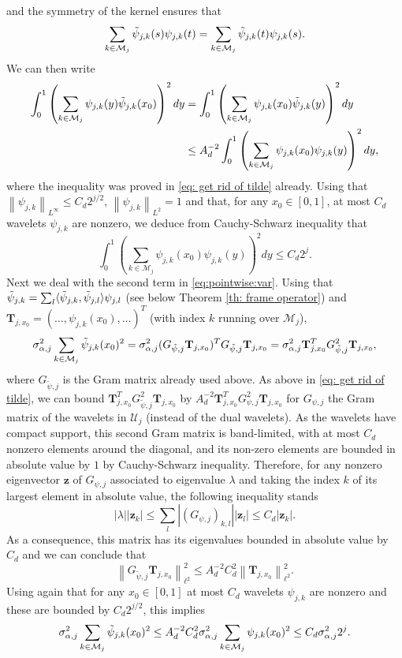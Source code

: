 \documentclass[preprint]{imsart}
\newcommand\norm[1]{\left\lVert#1\right\rVert}
\numberwithin{equation}{section}
\newcounter{cond}
\begin{document}
\begin{appendix}
and the symmetry of the kernel ensures that
\begin{equation}\label{eq: sym kernel splwav}
\sum_{k\in\mathcal{M}_{j}}\Tilde{\psi}_{j,k}(s) \psi_{j,k}(t) = \sum_{k\in\mathcal{M}_{j}}\Tilde{\psi}_{j,k}(t) \psi_{j,k}(s).
\end{equation}
We can then write
\begin{align*}
     \int_0^1 \left(\sum_{k\in\mathcal{M}_{j}} \psi_{j,k}(y)\Tilde{\psi}_{j,k}(x_0) \right)^2 dy &= \int_0^1 \left(\sum_{k\in\mathcal{M}_{j}} \psi_{j,k}(x_0)\Tilde{\psi}_{j,k}(y) \right)^2 dy\\
    &\leq A_d^{-2} \int_0^1 \left(\sum_{k\in\mathcal{M}_{j}} \psi_{j,k}(x_0)\psi_{j,k}(y) \right)^2 dy,
\end{align*}
where the inequality was proved in \eqref{eq: get rid of tilde} already. Using that $\norm{\psi_{j,k}}_{L^\infty}\leq C_d 2^{j/2}$, $\norm{\psi_{j,k}}_{L^2}= 1$ and that, for any $x_0\in[0,1]$, at most $C_d$ wavelets $\psi_{j,k}$ are nonzero, we deduce from Cauchy-Schwarz inequality that
\[\int_0^1 \left(\sum_{k\in\mathcal{M}_{j}} \psi_{j,k}(x_0)\psi_{j,k}(y) \right)^2 dy \leq C_d2^j.\]
Next we deal with the second term in \eqref{eq:pointwise:var}. Using that $\Tilde{\psi}_{j,k} = \sum_l \langle \Tilde{\psi}_{j,k}, \Tilde{\psi}_{j,l} \rangle  \psi_{j,l}$ (see below Theorem \ref{th: frame operator}) and $\mathbf{T}_{j,x_0}=(\dots,\psi_{j,k}(x_0),\dots)^T$ (with index $k$ running over $\mathcal{M}_j$),
\begin{align*}
\sigma_{\alpha,j}^2 \sum_{k\in\mathcal{M}_{j}}\Tilde{\psi}_{j,k}(x_0)^2 = \sigma_{\alpha,j}^2(G_{\tilde{\psi},j}\mathbf{T}_{j,x_0})^TG_{\tilde{\psi},j}\mathbf{T}_{j,x_0}= \sigma_{\alpha,j}^2\mathbf{T}_{j,x_0}^TG_{\tilde{\psi},j}^2\mathbf{T}_{j,x_0},
\end{align*}
where $G_{\tilde{\psi},j}$ is the Gram matrix already used above. As above in \eqref{eq: get rid of tilde}, we can bound $\mathbf{T}_{j,x_0}^TG_{\tilde{\psi},j}^2\mathbf{T}_{j,x_0}$ by $A_d^{-2}\mathbf{T}_{j,x_0}^TG_{\psi,j}^2\mathbf{T}_{j,x_0}$ for $G_{\psi,j}$ the Gram matrix of the wavelets in $\mathcal{U}_j$ (instead of the dual wavelets). As the wavelets have compact support, this second Gram matrix is band-limited, with at most $C_d$ nonzero elements around the diagonal, and its non-zero elements are bounded in absolute value by $1$ by Cauchy-Schwarz inequality. Therefore, for any nonzero eigenvector $\mathbf{z}$ of $G_{\psi,j}$ associated to eigenvalue $\lambda$ and taking the index $k$ of its largest element in absolute value, the following inequality stands
\[ |\lambda| |\mathbf{z}_k| \leq \sum_l \left|(G_{\psi,j})_{k,l}\right| |\mathbf{z}_l| \leq C_d |\mathbf{z}_k|. \]
As a consequence, this matrix has its eigenvalues bounded in absolute value by $C_d$ and we can conclude that
\[\norm{G_{\tilde{\psi},j}\mathbf{T}_{j,x_0}}^2_{\ell^2} \leq A_d^{-2} C_d^2 \norm{\mathbf{T}_{j,x_0}}^2_{\ell^2}.\]
Using again that for any $x_0\in[0,1]$ at most $C_d$ wavelets $\psi_{j,k}$ are nonzero and these are bounded by $C_d 2^{j/2}$, this implies 
\[\sigma_{\alpha,j}^2 \sum_{k\in\mathcal{M}_{j}}\Tilde{\psi}_{j,k}(x_0)^2 \leq A_d^{-2} C_d^2 \sigma_{\alpha,j}^2 \sum_{k\in\mathcal{M}_{j}}\psi_{j,k}(x_0)^2 \leq C_d \sigma_{\alpha,j}^2 2^j.\]



\end{appendix}
\end{document}

